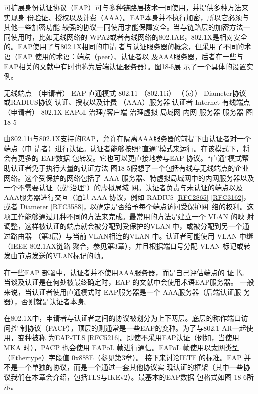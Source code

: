 可扩展身份认证协议（EAP）可与多种链路层技术一同使用，并提供多种方法来实现身
份验证、授权以及计费（AAA）。EAP本身并不执行加密，所以它必须与其他一些加密功能
较强的协议一同使用才能保障安全。当与链路层的加密方法一同使用时，比如无线网络的
WPA2或者有线网络的802.1AE，802.1X是相对安全的。EAP使用了与802.1X相同的申请
者与认证服务器的概念，但采用了不同的术语（EAP 使用的术语：端点（peer）、认证者以
及AAA服务器，后者在一些与EAP相关的文献中有时也称为后端认证服务器）。图18-5展
示了一个具体的设置实例。

无线端点
（申请者）
EAP
直通模式
802.11
（802.11i）
（（e））
Diameter协议
或RADIUS协议
认证、授权以及计费
（AAA）服务器
认证者
Internet
有线端点
（申请者）
802.1X
EAPoL
治理/客户端
治理虚拟
局域网
内网
服务器
服务器
图18-5

由802.11i与802.1X支持的EAP，允许在隔离AAA服务器的前提下由认证者对一个端点（申
请者）进行认证。认证者能够按照“直通”模式来运行。在该模式下，将会有更多的 EAP数据
包转发。它也可以更直接地参与EAP 协议。“直通”模式帮助认证者免于执行大量的认证方法
图18-5假想了一个包括有线与无线端点的企业网络。这个受保护的网络包括了 AAA
服务器、特虚拟局域网中的内网服务器以及一个不需要认证（或“治理”）的虚拟局域
网。认证者负责与未认证的端点以及 AAA服务器进行交互（通过 AAA 协议，例如 RADIUS
\href{https://www.rfc-editor.org/rfc/rfc2865}{[RFC2865]} \href{https://www.rfc-editor.org/rfc/rfc3162}{[RFC3162]}，或者 Diameter \href{https://www.rfc-editor.org/rfc/rfc3588}{[RFC3588]}，以确定是否给予每个端点访问受保护网\
络的权利。这项工作能够通过几种不同的方法来完成。最常用的方法是建立一个 VLAN 的映
射调整，这样被认证的端点就会被分配到受保护的VLAN 中，或被分配到另一个通过路由器
（第3层）与当前 VLAN相连的VLAN 中。认证者可能使用 VLAN 中继（IEEE 802.1AX链路
聚合，参见第3章），并且根据端口号分配 VLAN 标记或转发由节点发送的VLAN标记的帧。

\begin{tcolorbox}
    在一些EAP 部署中，认证者并不使用AAA服务器，而是自己评估端点的
    证书。当谈及认证是在何处被最终确定时，EAP 的文献中会使用术语EAP服务器。
    一般来说，当认证者使用直通模式时 EAP服务器是一个 AAA服务器（后端认证服
    务器），否则就是认证者本身。
\end{tcolorbox}

在802.1X中，申请者与认证者之间的协议被划分为上下两层。底层的称作端口访问控
制协议（PACP），顶层的则通常是一些EAP的变种。为了与802.1 AR一起使用，变种被称
为EAP-TLS \href{https://www.rfc-editor.org/rfc/rfc5216}{[RFC5216]}。即使不采用EAP认证（例如，当使用MKA 时），PACP 也会使用
EAPoL 帧进行通信。EAPoL 帧使用以太网类型（Ethertype）字段值 0x888E（参见第3章）。
接下来讨论IETF 的标准。EAP 并不是一个单独的协议，而是一个通过一套其他协议实
现认证的框架（其中一些协议我们在本章会介绍，包括TLS与IKEv2）。最基本的EAP数据
包格式如图 18-6所示。

